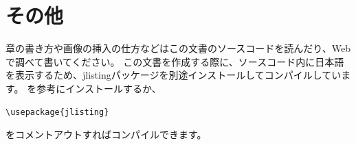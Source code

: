 \documentclass[twocolumn]{jarticle}
\begin{document}
\section{その他}
章の書き方や画像の挿入の仕方などはこの文書のソースコードを読んだり、Webで調べて書いてください。
この文書を作成する際に、ソースコード内に日本語を表示するため、jlistingパッケージを別途インストールしてコンパイルしています。
\cite[この記事]{jlisting}を参考にインストールするか、
\begin{lstlisting}
\usepackage{jlisting}
\end{lstlisting}
をコメントアウトすればコンパイルできます。

\begin{figure}[t]
    
    \label{setting}
\end{figure}


\end{document}
